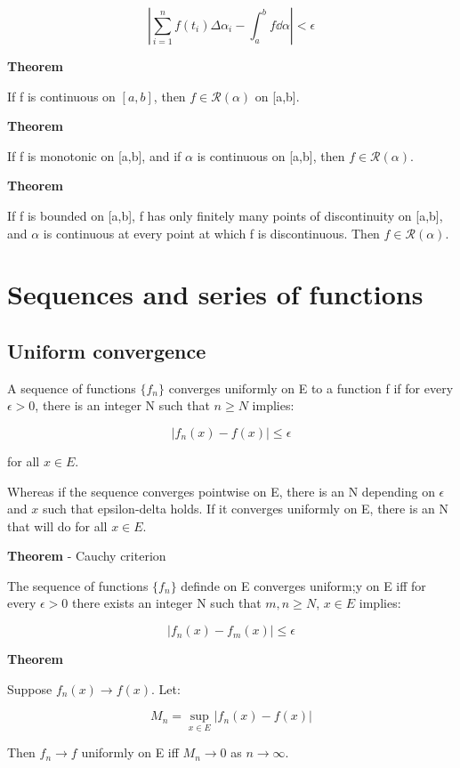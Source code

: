 \documentclass[11pt]{article}
\begin{document}
\[
\left\vert \sum_{i=1}^n f(t_i)\Delta\alpha_i - \int_a^b f\dd{\alpha} \right\vert < \epsilon
\]

\textbf{Theorem}

If f is continuous on \([a,b]\), then \(f \in \mathcal{R}(\alpha)\) on [a,b].

\textbf{Theorem}

If f is monotonic on [a,b], and if \(\alpha\) is continuous on [a,b], then \(f \in \mathcal{R}(\alpha)\).

\textbf{Theorem}

If f is bounded on [a,b], f has only finitely many points of discontinuity on [a,b], and \(\alpha\) is continuous at every point at which f is discontinuous. Then \(f \in \mathcal{R}(\alpha)\).

\section{Sequences and series of functions}
\label{sec:org1de9757}


\subsection{Uniform convergence}
\label{sec:org36c1519}

A sequence of functions \(\{f_n\}\) converges uniformly on E to a function f if for every \(\epsilon > 0\), there is an integer N such that \(n \geq N\) implies:

\[
\vert f_n(x) - f(x) \vert \leq \epsilon
\]

for all \(x \in E\).


Whereas if the sequence converges pointwise on E, there is an N depending on \(\epsilon\) and \(x\) such that epsilon-delta holds. If it converges uniformly on E, there is an N that will do for all \(x \in E\).

\textbf{Theorem} - Cauchy criterion

The sequence of functions \(\{f_n\}\) definde on E converges uniform;y on E iff for every \(\epsilon > 0\) there exists an integer N such that \(m,n \geq N\), \(x \in E\) implies:

\[
\vert f_n(x) - f_m(x) \vert \leq \epsilon
\]

\textbf{Theorem}

Suppose \(f_n(x) \to f(x)\). Let:

\[
M_n = \sup_{x\in E}\vert f_n(x) - f(x) \vert
\]

Then \(f_n \to f\) uniformly on E iff \(M_n \to 0\) as \(n \to \infty\).
\end{document}

